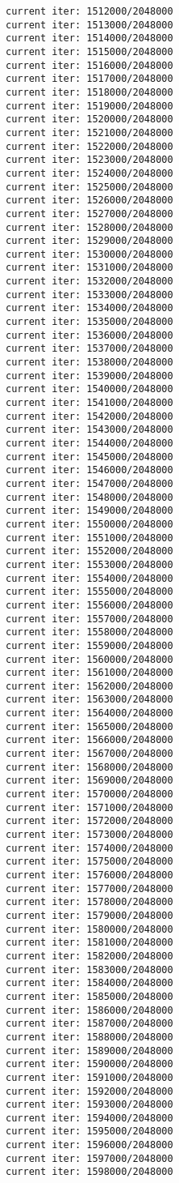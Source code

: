 \documentclass[11pt]{article}
\begin{document}
\begin{Verbatim}[commandchars=\\\{\}]
current iter: 1512000/2048000
current iter: 1513000/2048000
current iter: 1514000/2048000
current iter: 1515000/2048000
current iter: 1516000/2048000
current iter: 1517000/2048000
current iter: 1518000/2048000
current iter: 1519000/2048000
current iter: 1520000/2048000
current iter: 1521000/2048000
current iter: 1522000/2048000
current iter: 1523000/2048000
current iter: 1524000/2048000
current iter: 1525000/2048000
current iter: 1526000/2048000
current iter: 1527000/2048000
current iter: 1528000/2048000
current iter: 1529000/2048000
current iter: 1530000/2048000
current iter: 1531000/2048000
current iter: 1532000/2048000
current iter: 1533000/2048000
current iter: 1534000/2048000
current iter: 1535000/2048000
current iter: 1536000/2048000
current iter: 1537000/2048000
current iter: 1538000/2048000
current iter: 1539000/2048000
current iter: 1540000/2048000
current iter: 1541000/2048000
current iter: 1542000/2048000
current iter: 1543000/2048000
current iter: 1544000/2048000
current iter: 1545000/2048000
current iter: 1546000/2048000
current iter: 1547000/2048000
current iter: 1548000/2048000
current iter: 1549000/2048000
current iter: 1550000/2048000
current iter: 1551000/2048000
current iter: 1552000/2048000
current iter: 1553000/2048000
current iter: 1554000/2048000
current iter: 1555000/2048000
current iter: 1556000/2048000
current iter: 1557000/2048000
current iter: 1558000/2048000
current iter: 1559000/2048000
current iter: 1560000/2048000
current iter: 1561000/2048000
current iter: 1562000/2048000
current iter: 1563000/2048000
current iter: 1564000/2048000
current iter: 1565000/2048000
current iter: 1566000/2048000
current iter: 1567000/2048000
current iter: 1568000/2048000
current iter: 1569000/2048000
current iter: 1570000/2048000
current iter: 1571000/2048000
current iter: 1572000/2048000
current iter: 1573000/2048000
current iter: 1574000/2048000
current iter: 1575000/2048000
current iter: 1576000/2048000
current iter: 1577000/2048000
current iter: 1578000/2048000
current iter: 1579000/2048000
current iter: 1580000/2048000
current iter: 1581000/2048000
current iter: 1582000/2048000
current iter: 1583000/2048000
current iter: 1584000/2048000
current iter: 1585000/2048000
current iter: 1586000/2048000
current iter: 1587000/2048000
current iter: 1588000/2048000
current iter: 1589000/2048000
current iter: 1590000/2048000
current iter: 1591000/2048000
current iter: 1592000/2048000
current iter: 1593000/2048000
current iter: 1594000/2048000
current iter: 1595000/2048000
current iter: 1596000/2048000
current iter: 1597000/2048000
current iter: 1598000/2048000

\end{Verbatim}
\end{document}
